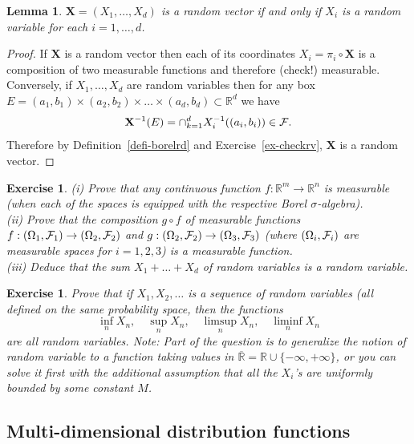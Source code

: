 \documentclass[12pt]{article}
\newtheorem{lem}[thm]{Lemma}
\newtheorem{exercise}[thm]{Exercise}
\newcommand{\R}{\mathbb{R}}
\theoremstyle{example}
\begin{document}
\begin{lem} $\mathbf{X}=(X_1,\ldots,X_d)$ is a random vector if and only if $X_i$ is a random variable for each $i=1,\ldots,d$.
\end{lem}

\begin{proof} If $\mathbf{X}$ is a random vector then each of its coordinates $X_i = \pi_i \circ \mathbf{X}$ is a composition of two measurable functions and therefore (check!) measurable. Conversely, if $X_1,\ldots,X_d$ are random variables then for any box $E=(a_1,b_1)\times(a_2,b_2)\times\ldots\times(a_d,b_d) \subset \R^d$ we have
$$ \mathbf{X}^{-1}(E) = \cap_{k=1}^d X_i^{-1}((a_i,b_i)) \in {\cal F}. $$
Therefore by Definition~\ref{defi-borelrd} and Exercise~\ref{ex-checkrv}, $\mathbf{X}$ is a random vector.
\end{proof}

\begin{exercise} (i) Prove that any continuous function $f:\R^m\to\R^n$ is measurable (when each of the spaces is equipped with the respective Borel $\sigma$-algebra).
\\
(ii) Prove that the composition $g\circ f$ of measurable functions $f:(\Omega_1, {\cal F}_1)\to (\Omega_2,{\cal F}_2)$ and $g:(\Omega_2, {\cal F}_2)\to (\Omega_3, {\cal F}_3)$ (where $(\Omega_i, {\cal F}_i)$ are measurable spaces for $i=1,2,3$) is a measurable function. \\
(iii) Deduce that the sum $X_1+\ldots+X_d$ of random variables is a random variable.
\end{exercise}

\begin{exercise} Prove that if $X_1, X_2, \ldots $ is a sequence of random variables (all defined on the same probability space, then the functions
$$ \inf_n X_n, \quad \sup_n X_n, \quad \limsup_n X_n, \quad \liminf_n X_n $$
are all random variables. Note: Part of the question is to generalize the notion of random variable to a function taking values in $\overline{\mathbb{R}} = \R \cup \{-\infty, +\infty \}$, or you can solve it first with the additional assumption that all the $X_i$'s are uniformly bounded by some constant $M$.
\end{exercise}

\subsection{Multi-dimensional distribution functions}
\end{document}
